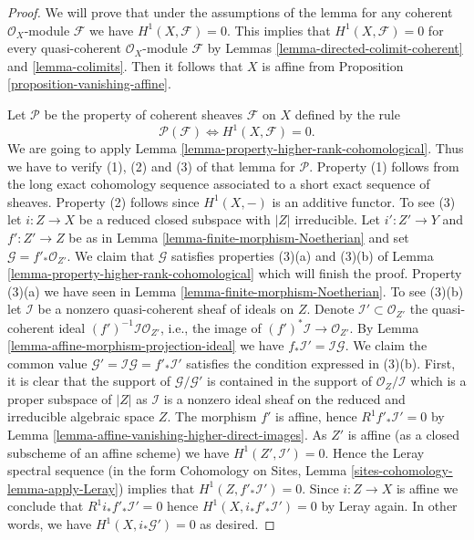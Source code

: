 \documentclass[10pt,a4paper]{amsart}
\theoremstyle{plain}
\theoremstyle{definition}
\theoremstyle{remark}
\numberwithin{equation}{subsection}
\begin{document}
\begin{proof}
We will prove that under the assumptions of the lemma for any coherent
$\mathcal{O}_X$-module $\mathcal{F}$ we have $H^1(X, \mathcal{F}) = 0$.
This implies that $H^1(X, \mathcal{F}) = 0$ for every quasi-coherent
$\mathcal{O}_X$-module $\mathcal{F}$ by
Lemmas \ref{lemma-directed-colimit-coherent} and \ref{lemma-colimits}.
Then it follows that $X$ is affine from
Proposition \ref{proposition-vanishing-affine}.

\medskip\noindent
Let $\mathcal{P}$ be the property of coherent sheaves
$\mathcal{F}$ on $X$ defined by the rule
$$
\mathcal{P}(\mathcal{F}) \Leftrightarrow H^1(X, \mathcal{F}) = 0.
$$
We are going to apply Lemma \ref{lemma-property-higher-rank-cohomological}.
Thus we have to verify (1), (2) and (3) of that lemma for $\mathcal{P}$.
Property (1) follows from the long exact cohomology sequence associated
to a short exact sequence of sheaves. Property (2) follows since
$H^1(X, -)$ is an additive functor. To see (3) let $i : Z \to X$ be
a reduced closed subspace with $|Z|$ irreducible. Let $i' : Z' \to Y$
and $f' : Z' \to Z$ be as in Lemma \ref{lemma-finite-morphism-Noetherian}
and set $\mathcal{G} = f'_*\mathcal{O}_{Z'}$. We claim that
$\mathcal{G}$ satisfies properties (3)(a) and (3)(b) of
Lemma \ref{lemma-property-higher-rank-cohomological}
which will finish the proof. Property (3)(a) we have seen in
Lemma \ref{lemma-finite-morphism-Noetherian}. To see (3)(b) let
$\mathcal{I}$ be a nonzero quasi-coherent sheaf of ideals on $Z$.
Denote $\mathcal{I}' \subset \mathcal{O}_{Z'}$ the quasi-coherent
ideal $(f')^{-1}\mathcal{I} \mathcal{O}_{Z'}$, i.e., the
image of $(f')^*\mathcal{I} \to \mathcal{O}_{Z'}$.
By Lemma \ref{lemma-affine-morphism-projection-ideal} we have
$f_*\mathcal{I}' = \mathcal{I} \mathcal{G}$.
We claim the common value
$\mathcal{G}' = \mathcal{I} \mathcal{G} = f'_*\mathcal{I}'$
satisfies the condition expressed in (3)(b).
First, it is clear that the support of $\mathcal{G}/\mathcal{G}'$
is contained in the support of $\mathcal{O}_Z/\mathcal{I}$
which is a proper subspace of $|Z|$ as $\mathcal{I}$ is a
nonzero ideal sheaf on the reduced and irreducible algebraic space $Z$.
The morphism $f'$ is affine, hence $R^1f'_*\mathcal{I}' = 0$ by
Lemma \ref{lemma-affine-vanishing-higher-direct-images}.
As $Z'$ is affine (as a closed subscheme of an affine scheme)
we have $H^1(Z', \mathcal{I}') = 0$. Hence the Leray
spectral sequence (in the form
Cohomology on Sites, Lemma \ref{sites-cohomology-lemma-apply-Leray})
implies that $H^1(Z, f'_*\mathcal{I}') = 0$.
Since $i : Z \to X$ is affine we conclude that
$R^1i_*f'_*\mathcal{I}' = 0$ hence $H^1(X, i_*f'_*\mathcal{I}') = 0$
by Leray again. In other words, we have $H^1(X, i_*\mathcal{G}') = 0$
as desired.
\end{proof}
\end{document}
